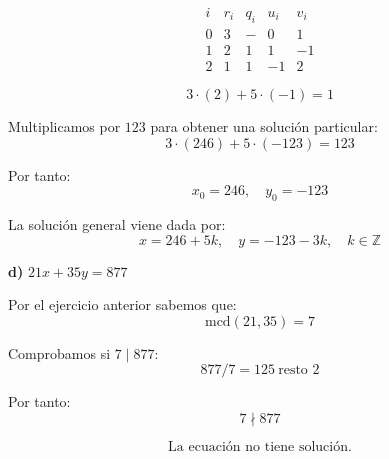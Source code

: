 \documentclass[a4paper,12pt]{article}
\begin{document}
\begin{ejercicio}[title=Ejercicio 9]

\[
\begin{array}{c|c|c|c|c}
i & r_i & q_i & u_i & v_i\\
\hline
0 & 3 & - & 0 & 1\\
1 & 2 & 1 & 1 & -1\\
2 & \boxed{1} & 1 & -1 & 2
\end{array}
\]

\[
3 \cdot (2) + 5 \cdot (-1) = \boxed{1}
\]

Multiplicamos por $123$ para obtener una solución particular:
\[
3 \cdot (246) + 5 \cdot (-123) = 123
\]

Por tanto:
\[
x_0 = 246, \quad y_0 = -123
\]

La solución general viene dada por:
\[
\boxed{
x = 246 + 5k, \quad y = -123 - 3k, \quad k \in \mathbb{Z}
}
\]

\textbf{d) } $21x + 35y = 877$

\vspace{0.5em}

Por el ejercicio anterior sabemos que:
\[
\text{mcd}(21,35) = 7
\]

Comprobamos si $7 \mid 877$:
\[
877 / 7 = 125 \ \text{resto } 2
\]

Por tanto:
\[
7 \nmid 877
\]

\[
\boxed{\text{La ecuación no tiene solución.}}
\]

\end{ejercicio}
\end{document}
